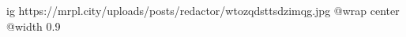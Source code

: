  
 
 
 
 

\ifcmt
  ig https://mrpl.city/uploads/posts/redactor/wtozqdsttsdzimqg.jpg
  @wrap center
  @width 0.9
\fi
